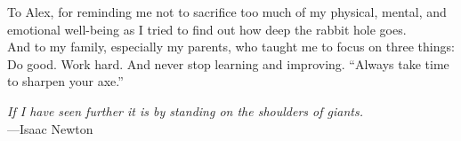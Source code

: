 %
\begin{frontmatter}

%
%
\makefrontmatter

%
%
%
%
%
%
\begin{dedication}
  To Alex, for reminding me not to sacrifice too much of my physical, mental, and emotional well-being as I tried to find out how deep the rabbit hole goes.
  \\And to my family, especially my parents, who taught me to focus on three things:
  \\Do good. Work hard. And never stop learning and improving.
  \newline \newline \newline
  ``Always take time to sharpen your axe.''
\end{dedication}


%
%



%
%
\begin{epigraph} %
  \emph{If I have seen further it is by standing on the shoulders of giants.}\\
  ---Isaac Newton
\end{epigraph}


\end{frontmatter}
